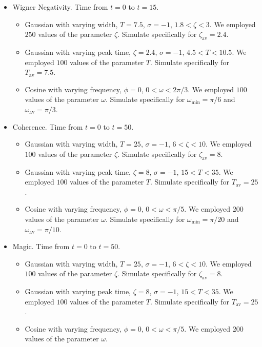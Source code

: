 \documentclass{article}
\begin{document}
\begin{itemize}
    \item Wigner Negativity. Time from $t=0$ to $t=15$.
    \begin{itemize}
        \item Gaussian with varying width, $T=7.5$, $\sigma=-1$, $1.8<\zeta<3$. We employed $250$ values of the parameter $\zeta$.
        Simulate specifically for $\zeta_{\text{av}}=2.4$.
        \item Gaussian with varying peak time, $\zeta=2.4$, $\sigma=-1$, $4.5<T<10.5$. We employed $100$ values of the parameter $T$.
       Simulate specifically for $T_{\text{av}}=7.5$.
        \item Cosine with varying frequency, $\phi=0$, $0<\omega<2\pi/3$. We employed $100$ values of the parameter $\omega$.
         Simulate specifically for $\omega_{\text{min}}=\pi/6$ and $\omega_{\text{av}}=\pi/3$.
    \end{itemize}
    \item Coherence. Time from $t=0$ to $t=50$.
    \begin{itemize}
        \item Gaussian with varying width, $T=25$, $\sigma=-1$, $6<\zeta<10$. We employed $100$ values of the parameter $\zeta$.
       Simulate specifically for $\zeta_{\text{av}}=8$.
        \item Gaussian with varying peak time, $\zeta=8$, $\sigma=-1$, $15<T<35$. We employed $100$ values of the parameter $T$.
       Simulate specifically for $T_{\text{av}}=25$.
        \item Cosine with varying frequency, $\phi=0$, $0<\omega<\pi/5$. We employed $200$ values of the parameter $\omega$.
             Simulate specifically for $\omega_{\text{min}}=\pi/20$ and $\omega_{\text{av}}=\pi/10$.
    \end{itemize}
    \item Magic. Time from $t=0$ to $t=50$.
    \begin{itemize}
         \item Gaussian with varying width, $T=25$, $\sigma=-1$, $6<\zeta<10$. We employed $100$ values of the parameter $\zeta$.
       Simulate specifically for $\zeta_{\text{av}}=8$.
        \item Gaussian with varying peak time, $\zeta=8$, $\sigma=-1$, $15<T<35$. We employed $100$ values of the parameter $T$.
         Simulate specifically for $T_{\text{av}}=25$.
        \item Cosine with varying frequency, $\phi=0$, $0<\omega<\pi/5$. We employed $200$ values of the parameter $\omega$.

\end{itemize}
\end{itemize}
\end{document}
